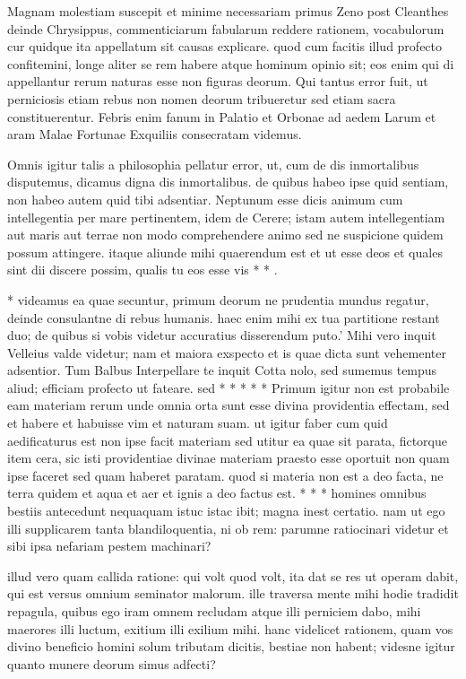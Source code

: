  Magnam molestiam suscepit et minime necessariam primus Zeno post Cleanthes deinde Chrysippus, commenticiarum fabularum reddere rationem, vocabulorum cur quidque ita appellatum sit causas explicare. quod cum facitis illud profecto confitemini, longe aliter se rem habere atque hominum opinio sit; eos enim qui di appellantur rerum naturas esse non figuras deorum. Qui tantus error fuit, ut perniciosis etiam rebus non nomen deorum tribueretur sed etiam sacra constituerentur. Febris enim fanum in Palatio et Orbonae ad aedem Larum et aram Malae Fortunae Exquiliis consecratam videmus.

 Omnis igitur talis a philosophia pellatur error, ut, cum de dis inmortalibus disputemus, dicamus digna dis inmortalibus. de quibus habeo ipse quid sentiam, non habeo autem quid tibi adsentiar. Neptunum esse dicis animum cum intellegentia per mare pertinentem, idem de Cerere; istam autem intellegentiam aut maris aut terrae non modo comprehendere animo sed ne suspicione quidem possum attingere. itaque aliunde mihi quaerendum est et ut esse deos et quales sint dii discere possim, qualis tu eos esse vis * * .

 * videamus ea quae secuntur, primum deorum ne prudentia mundus regatur, deinde consulantne di rebus humanis. haec enim mihi ex tua partitione restant duo; de quibus si vobis videtur accuratius disserendum puto.' Mihi vero inquit Velleius valde videtur; nam et maiora exspecto et is quae dicta sunt vehementer adsentior. Tum Balbus Interpellare te inquit Cotta nolo, sed sumemus tempus aliud; efficiam profecto ut fateare. sed * * * * * Primum igitur non est probabile eam materiam rerum unde omnia orta sunt esse divina providentia effectam, sed et habere et habuisse vim et naturam suam. ut igitur faber cum quid aedificaturus est non ipse facit materiam sed utitur ea quae sit parata, fictorque item cera, sic isti providentiae divinae materiam praesto esse oportuit non quam ipse faceret sed quam haberet paratam. quod si materia non est a deo facta, ne terra quidem et aqua et aer et ignis a deo factus est. * * * homines omnibus bestiis antecedunt nequaquam istuc istac ibit; magna inest certatio. nam ut ego illi supplicarem tanta blandiloquentia, ni ob rem: parumne ratiocinari videtur et sibi ipsa nefariam pestem machinari?

 illud vero quam callida ratione: qui volt quod volt, ita dat se res ut operam dabit, qui est versus omnium seminator malorum. ille traversa mente mihi hodie tradidit repagula, quibus ego iram omnem recludam atque illi perniciem dabo, mihi maerores illi luctum, exitium illi exilium mihi. hanc videlicet rationem, quam vos divino beneficio homini solum tributam dicitis, bestiae non habent; videsne igitur quanto munere deorum simus adfecti?

